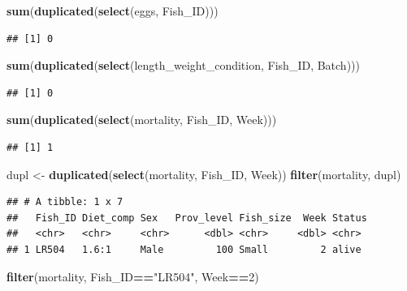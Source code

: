 \documentclass[]{book}
\newenvironment{Shaded}{\begin{snugshade}}{\end{snugshade}}
\newcommand{\DecValTok}[1]{\textcolor[rgb]{0.00,0.00,0.81}{#1}}
\newcommand{\KeywordTok}[1]{\textcolor[rgb]{0.13,0.29,0.53}{\textbf{#1}}}
\newcommand{\NormalTok}[1]{#1}
\newcommand{\OperatorTok}[1]{\textcolor[rgb]{0.81,0.36,0.00}{\textbf{#1}}}
\newcommand{\StringTok}[1]{\textcolor[rgb]{0.31,0.60,0.02}{#1}}
\begin{document}
\begin{Shaded}
\begin{Highlighting}[]
\KeywordTok{sum}\NormalTok{(}\KeywordTok{duplicated}\NormalTok{(}\KeywordTok{select}\NormalTok{(eggs, Fish_ID)))}
\end{Highlighting}
\end{Shaded}

\begin{verbatim}
## [1] 0
\end{verbatim}

\begin{Shaded}
\begin{Highlighting}[]
\KeywordTok{sum}\NormalTok{(}\KeywordTok{duplicated}\NormalTok{(}\KeywordTok{select}\NormalTok{(length_weight_condition, Fish_ID, Batch)))}
\end{Highlighting}
\end{Shaded}

\begin{verbatim}
## [1] 0
\end{verbatim}

\begin{Shaded}
\begin{Highlighting}[]
\KeywordTok{sum}\NormalTok{(}\KeywordTok{duplicated}\NormalTok{(}\KeywordTok{select}\NormalTok{(mortality, Fish_ID, Week)))}
\end{Highlighting}
\end{Shaded}

\begin{verbatim}
## [1] 1
\end{verbatim}

\begin{Shaded}
\begin{Highlighting}[]
\NormalTok{dupl <-}\StringTok{ }\KeywordTok{duplicated}\NormalTok{(}\KeywordTok{select}\NormalTok{(mortality, Fish_ID, Week))}
\KeywordTok{filter}\NormalTok{(mortality, dupl)}
\end{Highlighting}
\end{Shaded}

\begin{verbatim}
## # A tibble: 1 x 7
##   Fish_ID Diet_comp Sex   Prov_level Fish_size  Week Status
##   <chr>   <chr>     <chr>      <dbl> <chr>     <dbl> <chr> 
## 1 LR504   1.6:1     Male         100 Small         2 alive
\end{verbatim}

\begin{Shaded}
\begin{Highlighting}[]
\KeywordTok{filter}\NormalTok{(mortality, Fish_ID}\OperatorTok{==}\StringTok{"LR504"}\NormalTok{, Week}\OperatorTok{==}\DecValTok{2}\NormalTok{)}
\end{Highlighting}
\end{Shaded}
\end{document}

